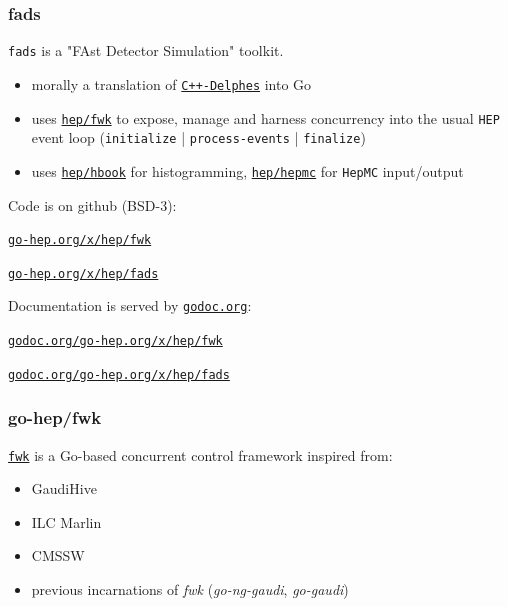 \documentclass[9pt]{beamer}
\newcommand{\myblue} [1] {{\color{blue}#1}}
\begin{document}
\begin{frame}[fragile]
\frametitle{fads}


\texttt{fads} is a "FAst Detector Simulation" toolkit.


\begin{itemize}
\item morally a translation of \myblue{\href{https://cp3.irmp.ucl.ac.be/projects/delphes}{\texttt{C++-Delphes}}} into Go
\item uses \myblue{\href{https://go-hep.org/x/hep/fwk}{\texttt{hep/fwk}}} to expose, manage and harness concurrency into the usual \texttt{HEP} event loop (\texttt{initialize} | \texttt{process-events} | \texttt{finalize})
\item uses \myblue{\href{https://go-hep.org/x/hep/hbook}{\texttt{hep/hbook}}} for histogramming, \myblue{\href{htpps://go-hep.org/x/hep/hepmc}{\texttt{hep/hepmc}}} for \texttt{HepMC} input/output
\end{itemize}

	\begin{block}{}
Code is on github (BSD-3):


\myblue{\href{https://go-hep.org/x/hep/fwk}{\texttt{go-hep.org/x/hep/fwk}}}

\myblue{\href{https://go-hep.org/x/hep/fads}{\texttt{go-hep.org/x/hep/fads}}}
	\end{block}{}

	\begin{exampleblock}{}
Documentation is served by \myblue{\href{https://godoc.org}{\texttt{godoc.org}}}:


\myblue{\href{https://godoc.org/go-hep.org/x/hep/fwk}{\texttt{godoc.org/go-hep.org/x/hep/fwk}}}

\myblue{\href{https://godoc.org/go-hep.org/x/hep/fads}{\texttt{godoc.org/go-hep.org/x/hep/fads}}}

	\end{exampleblock}{}

\end{frame}

\begin{frame}[fragile]
\frametitle{go-hep/fwk}


\myblue{\href{https://go-hep.org/x/hep/fwk}{\texttt{fwk}}} is a Go-based concurrent control framework inspired from:


\begin{itemize}
\item GaudiHive
\item ILC Marlin
\item CMSSW
\item previous incarnations of \emph{fwk} (\emph{go-ng-gaudi}, \emph{go-gaudi})
\end{itemize}


\end{frame}
\end{document}

